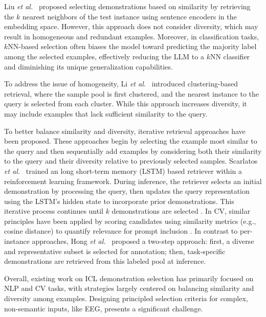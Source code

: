 \documentclass[journal,twocolumn]{IEEEtran}
\begin{document}
Liu \textit{et al.}~\cite{liu-etal-2022-makes} proposed selecting demonstrations based on similarity by retrieving the $k$ nearest neighbors of the test instance using sentence encoders in the embedding space. However, this approach does not consider diversity, which may result in homogeneous and redundant examples. Moreover, in classification tasks, $k$NN-based selection often biases the model toward predicting the majority label among the selected examples, effectively reducing the LLM to a $k$NN classifier and diminishing its unique generalization capabilities.

To address the issue of homogeneity, Li \textit{et al.}~\cite{li-etal-2024-self-prompting} introduced clustering-based retrieval, where the sample pool is first clustered, and the nearest instance to the query is selected from each cluster. While this approach increases diversity, it may include examples that lack sufficient similarity to the query.

To better balance similarity and diversity, iterative retrieval approaches have been proposed. These approaches begin by selecting the example most similar to the query and then sequentially add examples by considering both their similarity to the query and their diversity relative to previously selected samples. Scarlatos \textit{et al.}~\cite{scarlatos2023reticl} trained an long short-term memory (LSTM) based retriever within a reinforcement learning framework. During inference, the retriever selects an initial demonstration by processing the query, then updates the query representation using the LSTM's hidden state to incorporate prior demonstrations. This iterative process continues until $k$ demonstrations are selected \cite{luo2024context}. In CV, similar principles have been applied by scoring candidates using similarity metrics (e.g., cosine distance) to quantify relevance for prompt inclusion \cite{zhang2023makes}. In contrast to per-instance approaches, Hong \textit{et al.}~\cite{hongjin2022selective} proposed a two-step approach: first, a diverse and representative subset is selected for annotation; then, task-specific demonstrations are retrieved from this labeled pool at inference.

Overall, existing work on ICL demonstration selection has primarily focused on NLP and CV tasks, with strategies largely centered on balancing similarity and diversity among examples. Designing principled selection criteria for complex, non-semantic inputs, like EEG, presents a significant challenge.
\end{document}
